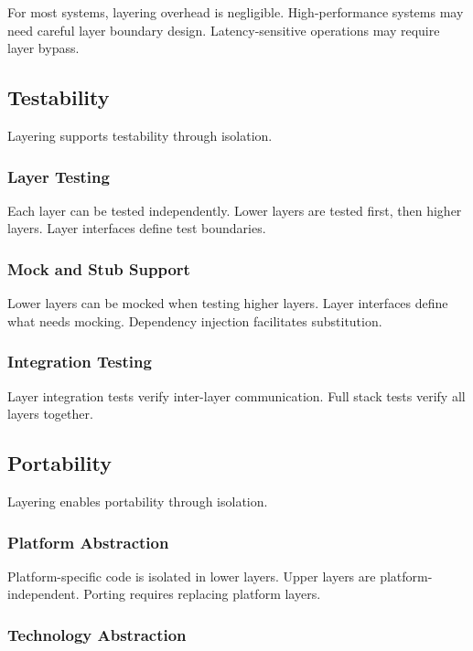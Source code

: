 \documentclass[11pt]{article}
\begin{document}
For most systems, layering overhead is negligible. High-performance systems may need careful layer boundary design. Latency-sensitive operations may require layer bypass.

\subsection{Testability}

Layering supports testability through isolation.

\subsubsection{Layer Testing}

Each layer can be tested independently. Lower layers are tested first, then higher layers. Layer interfaces define test boundaries.

\subsubsection{Mock and Stub Support}

Lower layers can be mocked when testing higher layers. Layer interfaces define what needs mocking. Dependency injection facilitates substitution.

\subsubsection{Integration Testing}

Layer integration tests verify inter-layer communication. Full stack tests verify all layers together.

\subsection{Portability}

Layering enables portability through isolation.

\subsubsection{Platform Abstraction}

Platform-specific code is isolated in lower layers. Upper layers are platform-independent. Porting requires replacing platform layers.

\subsubsection{Technology Abstraction}
\end{document}
